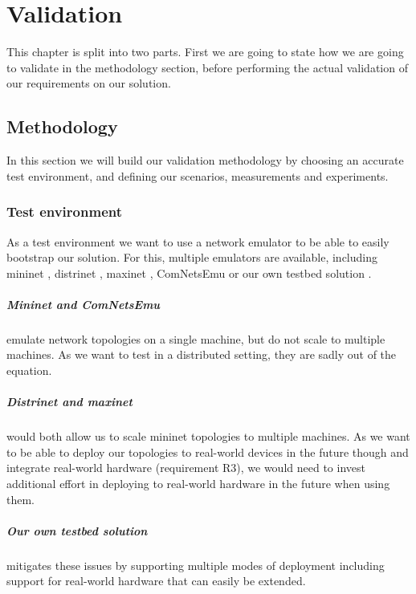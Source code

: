 \chapter{Validation}
\label{validation}

This chapter is split into two parts. First we are going to state how we are going to validate in the methodology section, before performing the actual validation of our requirements on our solution.


\section{Methodology}
\label{validation_methodology}
In this section we will build our validation methodology by choosing an accurate test environment, and defining our scenarios, measurements and experiments.

\subsection{Test environment}
As a test environment we want to use a network emulator to be able to easily bootstrap our solution. For this, multiple emulators are available, including mininet \cite{mininet}, distrinet \cite{distrinet1, distrinet2}, maxinet \cite{maxinet}, ComNetsEmu \cite{comnetsemu} or our own testbed solution \cite{owntb}.

\paragraph{Mininet and ComNetsEmu} emulate network topologies on a single machine, but do not scale to multiple machines. As we want to test in a distributed setting, they are sadly out of the equation.

\paragraph{Distrinet and maxinet} would both allow us to scale mininet topologies to multiple machines. As we want to be able to deploy our topologies to real-world devices in the future though and integrate real-world hardware (requirement R3), we would need to invest additional effort in deploying to real-world hardware in the future when using them.

\paragraph{Our own testbed solution} mitigates these issues by supporting multiple modes of deployment including support for real-world hardware that can easily be extended.

